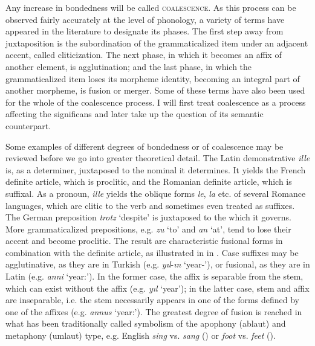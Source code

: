 Any increase in bondedness will be called \textsc{coalescence}. As this process can be observed fairly accurately at the level of phonology, a variety of terms have appeared in the literature to designate its phases. The first step away from juxtaposition is the subordination of the grammaticalized item under an adjacent accent, called cliticization. The next phase, in which it becomes an affix of another element, is agglutination; and the last phase, in which the grammaticalized item loses its morpheme identity, becoming an integral part of another morpheme, is fusion or merger. Some of these terms have also been used for the whole of the coalescence process. I will first treat coalescence as a process affecting the significans and later take up the question of its semantic counterpart.

Some examples of different degrees of bondedness or of coalescence may be reviewed before we go into greater theoretical detail. The Latin demonstrative \textit{ille} is, as a determiner, juxtaposed to the nominal it determines. It yields the French definite article, which is proclitic, and the Romanian definite article, which is suffixal. As a pronoun, \textit{ille} yields the oblique forms \textit{le}, \textit{la} etc. of several Romance languages, which are clitic to the verb and sometimes even treated as suffixes. The German preposition \textit{trotz} ‘despite’ is juxtaposed to the \np which it governs. More grammaticalized prepositions, e.g. \textit{zu} ‘to’ and \textit{an} ‘at’, tend to lose their accent and become proclitic. The result are characteristic fusional forms in combination with the definite article, as illustrated in  in . Case suffixes may be agglutinative, as they are in Turkish (e.g. \textit{yıl}{}-\textit{ın} ‘year-\gen'), or fusional, as they are in Latin (e.g. \textit{anni} ‘year:\gen’). In the former case, the affix is separable from the stem, which can exist without the affix (e.g. \textit{yıl} ‘year’); in the latter case, stem and affix are inseparable, i.e. the stem necessarily appears in one of the forms defined by one of the affixes (e.g. \textit{annus} ‘year:\glnom’). The greatest degree of fusion is reached in what has been traditionally called symbolism of the apophony (ablaut) and metaphony (umlaut) type, e.g. English \textit{sing} vs. \textit{sang} (\past) or \textit{foot} vs. \textit{feet} (\glpl).

